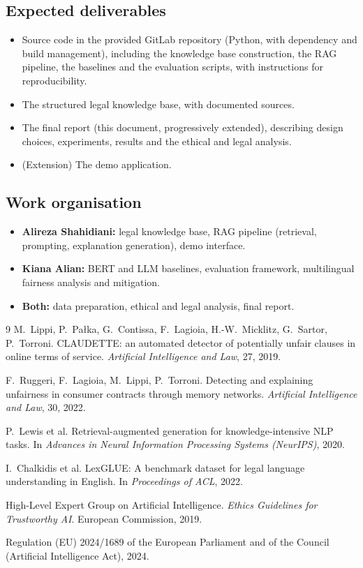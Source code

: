 \documentclass[10pt,a4paper]{article}
\begin{document}
\subsection{Expected deliverables}
\begin{itemize}
  \item Source code in the provided GitLab repository (Python, with dependency and build management), including the knowledge base construction, the RAG pipeline, the baselines and the evaluation scripts, with instructions for reproducibility.
  \item The structured legal knowledge base, with documented sources.
  \item The final report (this document, progressively extended), describing design choices, experiments, results and the ethical and legal analysis.
  \item (Extension) The demo application.
\end{itemize}

\subsection{Work organisation}
\begin{itemize}
  \item \textbf{Alireza Shahidiani:} legal knowledge base, RAG pipeline (retrieval, prompting, explanation generation), demo interface.
  \item \textbf{Kiana Alian:} BERT and LLM baselines, evaluation framework, multilingual fairness analysis and mitigation.
  \item \textbf{Both:} data preparation, ethical and legal analysis, final report.
\end{itemize}

\begin{thebibliography}{9}\small
{}
M.~Lippi, P.~Pałka, G.~Contissa, F.~Lagioia, H.-W.~Micklitz, G.~Sartor, P.~Torroni.
\newblock CLAUDETTE: an automated detector of potentially unfair clauses in online terms of service.
\newblock \emph{Artificial Intelligence and Law}, 27, 2019.

F.~Ruggeri, F.~Lagioia, M.~Lippi, P.~Torroni.
\newblock Detecting and explaining unfairness in consumer contracts through memory networks.
\newblock \emph{Artificial Intelligence and Law}, 30, 2022.

P.~Lewis et al.
\newblock Retrieval-augmented generation for knowledge-intensive NLP tasks.
\newblock In \emph{Advances in Neural Information Processing Systems (NeurIPS)}, 2020.

I.~Chalkidis et al.
\newblock LexGLUE: A benchmark dataset for legal language understanding in English.
\newblock In \emph{Proceedings of ACL}, 2022.

High-Level Expert Group on Artificial Intelligence.
\newblock \emph{Ethics Guidelines for Trustworthy AI}.
\newblock European Commission, 2019.

Regulation (EU) 2024/1689 of the European Parliament and of the Council (Artificial Intelligence Act), 2024.
\end{thebibliography}
\end{document}
